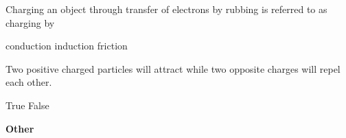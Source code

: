 \documentclass[]{exam}
\begin{document}
\begin{questions}
\question
Charging an object through transfer of electrons by rubbing is referred to as charging by

\begin{randomizechoices}
    \choice conduction
    \choice induction
    \correctchoice friction
\end{randomizechoices}



\question
Two positive charged particles will attract while two opposite charges will repel each other.

\begin{randomizechoices}[norandomize]
    \choice True
    \correctchoice False
\end{randomizechoices}


\end{questions}

{\large \textbf{Other}}
\end{document}
